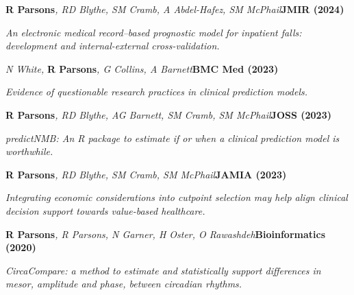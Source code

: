 \item
    \textbf{R Parsons}\textit{, RD Blythe, SM Cramb, A Abdel-Hafez, SM McPhail}\textbf{\hfill{JMIR (2024)}}\par
    \textit{An electronic medical record–based prognostic model for inpatient falls: development and internal-external cross-validation.}
\item
    \textit{N White, }\textbf{R Parsons}\textit{, G Collins, A Barnett}\textbf{\hfill{BMC Med (2023)}}\par
    \textit{Evidence of questionable research practices in clinical prediction models.}
\item
    \textbf{R Parsons}\textit{, RD Blythe, AG Barnett, SM Cramb, SM McPhail}\textbf{\hfill{JOSS (2023)}}\par
    \textit{predictNMB: An R package to estimate if or when a clinical prediction model is worthwhile.}
\item
    \textbf{R Parsons}\textit{, RD Blythe, SM Cramb, SM McPhail}\textbf{\hfill{JAMIA (2023)}}\par
    \textit{Integrating economic considerations into cutpoint selection may help align clinical decision support towards value-based healthcare.}
\item
    \textbf{R Parsons}\textit{, R Parsons, N Garner, H Oster, O Rawashdeh}\textbf{\hfill Bioinformatics (2020)}\par 
    \textit{CircaCompare: a method to estimate and statistically support differences in mesor, amplitude and phase, between circadian rhythms.}
